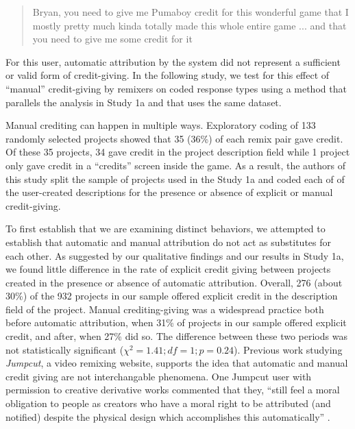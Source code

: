 \begin{quote}
  Bryan, you need to give me Pumaboy credit for this wonderful game
  that I mostly pretty much kinda totally made this whole entire game
  ... and that you need to give me some credit for it
\end{quote}

For this user, automatic attribution by the system did not represent a
sufficient or valid form of credit-giving. In the following study, we
test for this effect of ``manual'' credit-giving by remixers on coded
response types using a method that parallels the analysis in Study 1a
and that uses the same dataset.

Manual crediting can happen in multiple ways.  Exploratory coding of
133 randomly selected projects showed that 35 (36\%) of each remix pair gave
credit.  Of these 35 projects, 34 gave credit in the project
description field while 1 project only gave credit in a ``credits''
screen inside the game. As a result, the authors of this study split
the sample of projects used in the Study 1a and coded each of of the
user-created descriptions for the presence or absence of explicit or
manual credit-giving.

To first establish that we are examining distinct behaviors, we
attempted to establish that automatic and manual attribution do not
act as substitutes for each other. As suggested by our qualitative
findings and our results in Study 1a, we found little difference in
the rate of explicit credit giving between projects created in the
presence or absence of automatic attribution. Overall, 276 (about
30\%) of the 932 projects in our sample offered explicit credit in the
description field of the project. Manual crediting-giving was a
widespread practice both before automatic attribution, when 31\% of
projects in our sample offered explicit credit, and after, when 27\%
did so.  The difference between these two periods was not
statistically significant ($\chi^2=1.41; df=1; p=0.24$). Previous work
studying \emph{Jumpcut}, a video remixing website, supports the idea
that automatic and manual credit giving are not interchangable
phenomena.  One Jumpcut user with permission to creative derivative
works commented that they, ``still feel a moral obligation to people
as creators who have a moral right to be attributed (and notified)
despite the physical design which accomplishes this automatically''
\cite{diakopoulos_evolution_2007}.

